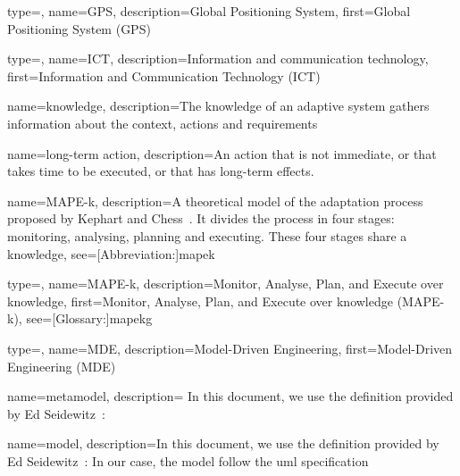 {
	type=\acronymtype,
	name={GPS},
	description={Global Positioning System},
	first={Global Positioning System (GPS)}
}

{
	type=\acronymtype,
	name={ICT},
	description={Information and communication technology},
	first={Information and Communication Technology (ICT)}
}

{
	name={knowledge},
	description={The knowledge of an adaptive system gathers information about the \gls{context}, \glspl{action} and \glspl{requirement}}
}

{
	name={long-term action},
	description={An \gls{action} that is not immediate, or that takes time to be executed, or that has long-term effects.}
}

{
	name={MAPE-k},
    description={A theoretical model of the adaptation process proposed by Kephart and Chess~\cite{DBLP:journals/computer/KephartC03}. It divides the process in four stages: monitoring, analysing, planning and executing. These four stages share a \gls{knowledge}},
    see=[Abbreviation:]{mapek}
}

{
	type=\acronymtype, 
	name={MAPE-k}, 
	description={Monitor, Analyse, Plan, and Execute over knowledge}, 
	first={Monitor, Analyse, Plan, and Execute over knowledge (MAPE-k)}, 
	see=[Glossary:]{mapekg}
}

{
	type=\acronymtype, 
	name={MDE},
	description={Model-Driven Engineering},
	first={Model-Driven Engineering (MDE)}
}

{
	name={metamodel},
	description={
In this document, we use the definition provided by Ed Seidewitz~\cite{DBLP:journals/software/Seidewitz03}: }
}

{
	name={model},
	description={In this document, we use the definition provided by Ed Seidewitz~\cite{DBLP:journals/software/Seidewitz03}:  In our case, the model follow the \gls{uml} specification~\cite{omg2017umlspec}}
}

